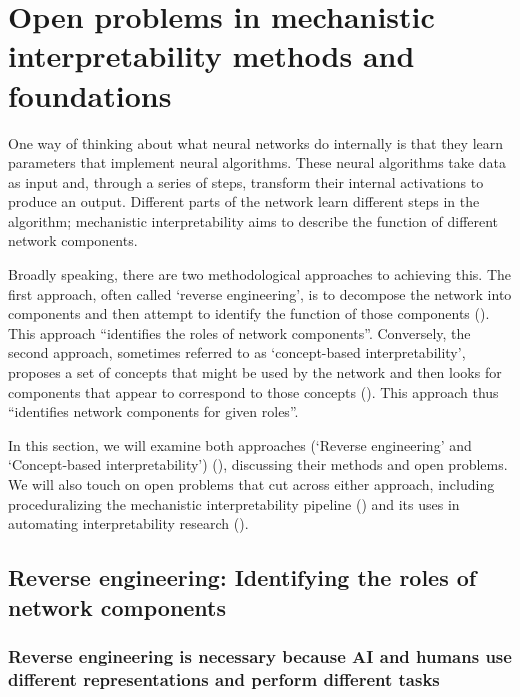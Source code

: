 \section{Open problems in mechanistic interpretability methods and foundations}
\label{sec:open-problems-methods-and-foundations}

One way of thinking about what neural networks do internally is that they learn parameters that implement neural algorithms. These neural algorithms take data as input and, through a series of steps, transform their internal activations to produce an output. Different parts of the network learn different steps in the algorithm; mechanistic interpretability aims to describe the function of different network components. 

Broadly speaking, there are two methodological approaches to achieving this. The first approach, often called `reverse engineering', is to decompose the network into components and then attempt to identify the function of those components (). This approach “identifies the roles of network components”. Conversely, the second approach, sometimes referred to as `concept-based interpretability', proposes a set of concepts that might be used by the network and then looks for components that appear to correspond to those concepts (). This approach thus “identifies network components for given roles”.

In this section, we will examine both approaches (`Reverse engineering' and `Concept-based interpretability') (), discussing their methods and open problems. We will also touch on open problems that cut across either approach, including proceduralizing the mechanistic interpretability pipeline () and its uses in automating interpretability research ().

\subsection{Reverse engineering: Identifying the roles of network components}
\label{subsec:reverse-engineering}

\subsubsection{Reverse engineering is necessary because AI and humans use different representations and perform different tasks}
\label{subsubsec:reverse-engineering-necessary}

